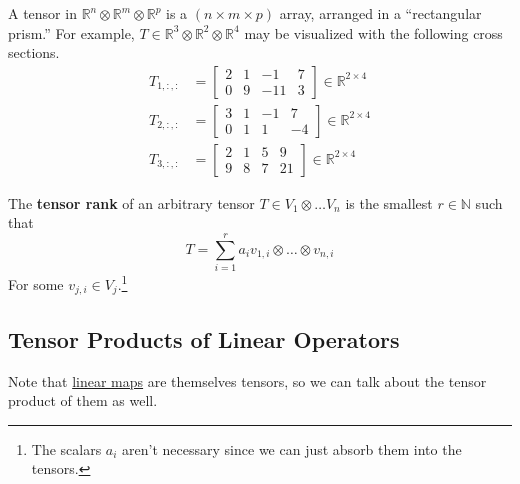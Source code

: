 	\begin{example}
	  \label{ex:3-tensor-as-a-multidimensional-array}
		A tensor in $\mathbb{R}^n \otimes \mathbb{R}^m \otimes \mathbb{R}^p$ is a $(n \times m \times p)$ array, arranged in a ``rectangular prism.'' For example, $T \in \mathbb{R}^3 \otimes \mathbb{R}^2 \otimes \mathbb{R}^4$ may be visualized with the following cross sections. 
		\begin{align}
			T_{1,:,:} & = \begin{bmatrix} 
				2 & 1 & -1 & 7 \\ 
				0 & 9 & -11 & 3
			\end{bmatrix} \in \mathbb{R}^{2 \times 4} \\ 
			T_{2,:,:} & = \begin{bmatrix} 
				3 & 1 & -1 & 7 \\ 
				0 & 1 & 1 & -4
			\end{bmatrix} \in \mathbb{R}^{2 \times 4} \\ 
			T_{3,:,:} & = \begin{bmatrix} 
				2 & 1 & 5 & 9 \\ 
				9 & 8 & 7 & 21
			\end{bmatrix} \in \mathbb{R}^{2 \times 4}
		\end{align}
	\end{example}

	\begin{definition}
	  \label{def:tensor-rank}
		The \textbf{tensor rank} of an arbitrary tensor $T \in V_1 \otimes \ldots V_n$ is the smallest $r \in \mathbb{N}$ such that 
		\begin{equation}
			T = \sum_{i=1}^r a_i v_{1, i} \otimes \ldots \otimes v_{n, i}
		\end{equation}
		For some $v_{j, i} \in V_j$.\footnote{The scalars $a_i$ aren't necessary since we can just absorb them into the tensors.}
	\end{definition}

\subsection{Tensor Products of Linear Operators}

  Note that \hyperref[def:linear_map]{linear maps} are themselves tensors, so we can talk about the tensor product of them as well. 

